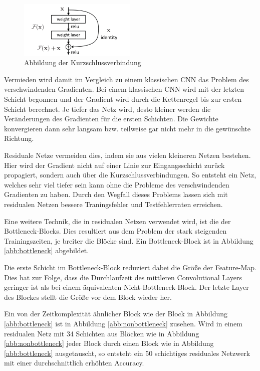 \begin{figure}[h]
 \centering
 \includegraphics[width=0.5\textwidth]{KapitelPartA/images/kurzschluss.png}
 \caption{Abbildung der Kurzschlussverbindung \cite{resnet}}
 \label{abb:residual}
\end{figure}



Vermieden wird damit im Vergleich zu einem klassischen CNN das Problem des verschwindenden Gradienten. Bei einem klassischen CNN wird mit der letzten Schicht begonnen und der Gradient wird durch die Kettenregel bis zur ersten Schicht berechnet. Je tiefer das Netz wird, desto kleiner werden die Veränderungen des Gradienten für die ersten Schichten. Die Gewichte konvergieren dann sehr langsam bzw. teilweise gar nicht mehr in die gewünschte Richtung.


Residuale Netze vermeiden dies, indem sie aus vielen kleineren Netzen bestehen. Hier wird der Gradient nicht auf einer Linie zur Eingangsschicht zurück propagiert, sondern auch über die Kurzschlussverbindungen. So entsteht ein Netz, welches sehr viel tiefer sein kann ohne die Probleme des verschwindenden Gradienten zu haben. Durch den Wegfall dieses Problems lassen sich mit residualen Netzen bessere Traningsfehler und Testfehlerraten erreichen.

Eine weitere Technik, die in residualen Netzen verwendet wird, ist die der Bottleneck-Blocks. Dies resultiert aus dem Problem der stark steigenden Trainingszeiten, je breiter die Blöcke sind. Ein Bottleneck-Block ist in Abbildung \ref{abb:bottleneck} abgebildet.

Die erste Schicht im Bottleneck-Block reduziert dabei die Größe der Feature-Map. Dies hat zur Folge, dass die Durchlaufzeit des mittleren Convolutional Layers geringer ist als bei einem äquivalenten Nicht-Bottleneck-Block. Der letzte Layer des Blockes stellt die Größe vor dem Block wieder her.

Ein von der Zeitkomplexität ähnlicher Block wie der Block in Abbildung \ref{abb:bottleneck} ist in Abbildung \ref{abb:nonbottleneck} zusehen. Wird in einem residualen Netz mit 34 Schichten  aus Blöcken wie in Abbildung \ref{abb:nonbottleneck} jeder Block durch einen Block wie in Abbildung \ref{abb:bottleneck} ausgetauscht, so entsteht ein 50 schichtiges residuales Netzwerk mit einer durchschnittlich erhöhten Accuracy.


